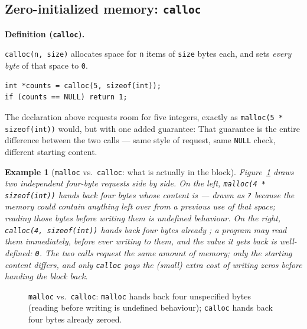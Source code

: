 \documentclass[11pt]{article}
\newtheorem{example}{Example}[section]
\newenvironment{definitionbox}[1]{%
  \par\noindent\textbf{Definition (#1).}\ \itshape
}{\par\vspace{0.3em}}
\begin{document}
\subsection{Zero-initialized memory: \texttt{calloc}}

\begin{definitionbox}{\texttt{calloc}}
\texttt{calloc(n, size)} allocates space for \texttt{n} items of \texttt{size}
bytes each, and sets \emph{every byte} of that space to \texttt{0}.
\end{definitionbox}

{\footnotesize
\begin{verbatim}
int *counts = calloc(5, sizeof(int));
if (counts == NULL) return 1;
\end{verbatim}
}
The declaration above requests room for five integers, exactly as
\texttt{malloc(5 * sizeof(int))} would, but with one added guarantee:
 That
guarantee is the entire difference between the two calls --- same style of
request, same \texttt{NULL} check, different starting content.

\begin{example}[\texttt{malloc} vs.\ \texttt{calloc}: what is actually in the block]
Figure~\ref{fig:malloc-calloc} draws two independent four-byte requests side
by side. On the left, \texttt{malloc(4 * sizeof(int))} hands back four bytes
whose content is  --- drawn as \texttt{?} because the memory
could contain anything left over from a previous use of that space; reading
those bytes \emph{before writing them} is undefined behaviour. On the right,
\texttt{calloc(4, sizeof(int))} hands back four bytes already ; a program may read them immediately, before ever writing to them, and
the value it gets back is well-defined: \texttt{0}. The two calls request the
same amount of memory; only the starting content differs, and only
\texttt{calloc} pays the (small) extra cost of writing zeros before handing
the block back.
\end{example}

\begin{figure}[h]
  \centering
  \caption{\texttt{malloc} vs.\ \texttt{calloc}: \texttt{malloc} hands back
  four unspecified bytes (reading before writing is undefined behaviour);
  \texttt{calloc} hands back four bytes already zeroed.}
  \label{fig:malloc-calloc}
\end{figure}
\end{document}
